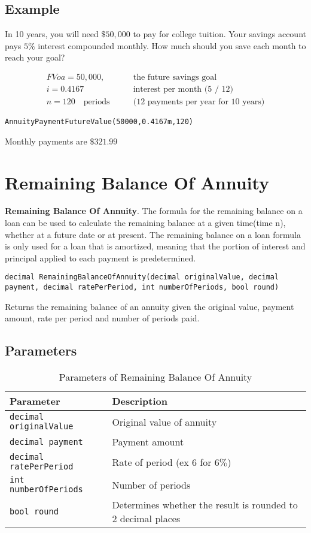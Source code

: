 \subsection{Example}
In 10 years, you will need $\$50,000$ to pay for college tuition. Your savings account pays $5\%$ interest compounded monthly.  How much should you save each month to reach your goal?

\begin{align*}
FVoa = 50,000, \qquad &\text{the future savings goal}\\
i =  0.4167 \qquad & \text{interest per month (5 / 12)}\\
n = 120\quad \text{periods} \qquad &\text{(12 payments per year for 10 years)}
\end{align*}

\begin{lstlisting}
AnnuityPaymentFutureValue(50000,0.4167m,120)
\end{lstlisting}
Monthly payments are $\$321.99$








\section{Remaining Balance Of Annuity}
\textbf{Remaining Balance Of Annuity}. The formula for the remaining balance on a loan can be used to calculate the remaining balance at a given time(time n), whether at a future date or at present. The remaining balance on a loan formula is only used for a loan that is amortized, meaning that the portion of interest and principal applied to each payment is predetermined.
\begin{lstlisting}
decimal RemainingBalanceOfAnnuity(decimal originalValue, decimal payment, decimal ratePerPeriod, int numberOfPeriods, bool round)
\end{lstlisting}
Returns the remaining balance of an annuity given the original value, payment amount, rate per period and number of periods paid.


\newpage %
\subsection{Parameters}
\begin{table}[h]
\begin{tabular}{|l|l|}
\hline
\textbf{Parameter} & \textbf{Description}\\
\hline
\verb|decimal originalValue| & Original value of annuity\\
\verb|decimal payment| & Payment amount\\
\verb|decimal ratePerPeriod| & Rate of period (ex $6$ for $6\%$)\\
\verb|int numberOfPeriods| & Number of periods\\
\verb|bool round| & Determines whether the result is rounded to $2$ decimal places\\
\hline
\end{tabular}
\caption{Parameters of Remaining Balance Of Annuity}
\end{table}
